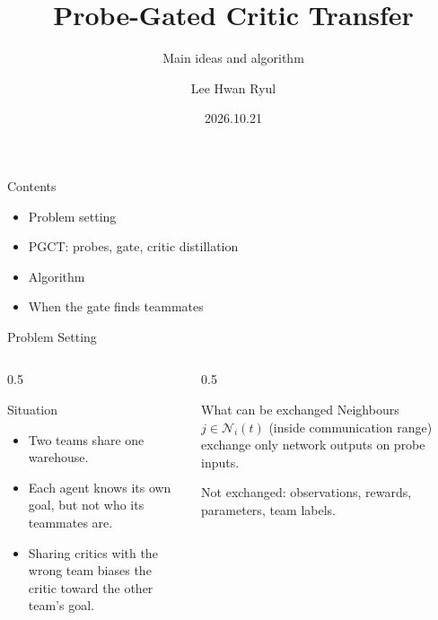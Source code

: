 \documentclass{beamer}
\title{Probe-Gated Critic Transfer}
\subtitle{Main ideas and algorithm}
\author{Lee Hwan Ryul}
\date{2026.10.21}
\begin{document}
\begin{frame}
  \titlepage
\end{frame}

\begin{frame}{Contents}
  \begin{itemize}
    \item Problem setting
    \item PGCT: probes, gate, critic distillation
    \item Algorithm
    \item When the gate finds teammates
  \end{itemize}
\end{frame}

\begin{frame}{Problem Setting}
  \begin{columns}[T]
    \begin{column}{0.5\textwidth}
      \begin{block}{Situation}
        \begin{itemize}
          \item Two teams share one warehouse.
          \item Each agent knows its own goal, but not who its teammates are.
          \item Sharing critics with the wrong team biases the critic toward the other team's goal.
        \end{itemize}
      \end{block}
    \end{column}
    \begin{column}{0.5\textwidth}
      \begin{block}{What can be exchanged}
        Neighbours $j \in \mathcal{N}_i(t)$ (inside communication range) exchange only network outputs on probe inputs.

        \medskip
        Not exchanged: observations, rewards, parameters, team labels.
      \end{block}
    \end{column}
  \end{columns}
\end{frame}
\end{document}
